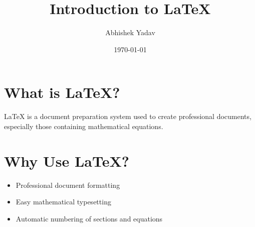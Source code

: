 \documentclass{article}
\title{Introduction to LaTeX}
\author{Abhishek Yadav}
\date{\today}
\begin{document}
\maketitle

\section{What is LaTeX?}

LaTeX is a document preparation system used to create
professional documents, especially those containing
mathematical equations.

\section{Why Use LaTeX?}

\begin{itemize}
    \item Professional document formatting
    \item Easy mathematical typesetting
    \item Automatic numbering of sections and equations
\end{itemize}
\end{document}
